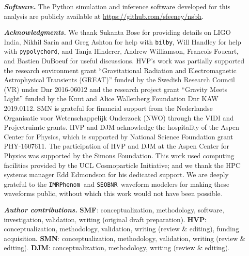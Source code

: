 \documentclass[%
 reprint,
 superscriptaddress,
 nofootinbib,
 amsmath,amssymb,
 aps,
]{revtex4-2}
\newcommand{\seobnr}{\texttt{SEOBNR}}
\newcommand{\imrp}{\texttt{IMRPhenom}}
\begin{document}
\textbf{\emph{Software.}} The Python simulation and inference software developed for this analysis are publicly available at \url{https://github.com/sfeeney/nsbh}.


\textbf{\emph{Acknowledgments.}} We thank Sukanta Bose for providing details on LIGO India, Nikhil Sarin and Greg Ashton for help with \texttt{bilby}, Will Handley for help with \texttt{pypolychord}, and Tanja Hinderer, Andrew Williamson, Francois Foucart, and Bastien DuBoeuf for useful discussions. HVP's work was partially supported the research environment grant ``Gravitational Radiation and Electromagnetic Astrophysical Transients (GREAT)'' funded by the Swedish Research Council (VR) under Dnr 2016-06012 and the research project grant ``Gravity Meets Light'' funded by the Knut and Alice Wallenberg Foundation Dnr KAW 2019.0112. SMN is grateful for financial support from the Nederlandse Organisatie voor Wetenschappelijk Onderzoek (NWO) through the VIDI and Projectruimte grants. HVP and DJM acknowledge the hospitality of the Aspen Center for Physics, which is supported by National Science Foundation grant PHY-1607611. The participation of HVP and DJM at the Aspen Center for Physics was supported by the Simons Foundation. This work used computing facilities provided by the UCL Cosmoparticle Initiative; and we thank the HPC systems manager Edd Edmondson for his dedicated support. We are deeply grateful to the \imrp\ and \seobnr\ waveform modelers for making these waveforms public, without which this work would not have been possible.

\textbf{\emph{Author contributions.}} {\bf SMF}: conceptualization, methodology, software, investigation, validation, writing (original draft preparation). {\bf HVP}: conceptualization, methodology, validation, writing (review \& editing), funding acquisition. {\bf SMN}: conceptualization, methodology, validation, writing (review \& editing). {\bf DJM}: conceptualization, methodology, writing (review \& editing).


\end{document}
